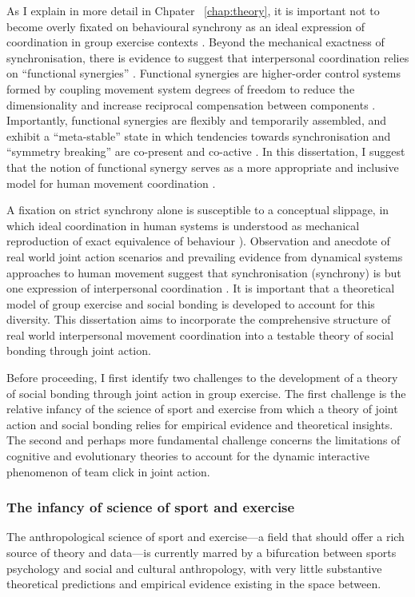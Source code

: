 \begin{CJK}{UTF8}{gbsn}
As I explain in more detail in Chpater ~\ref{chap:theory}, it is important not to become overly fixated on behavioural synchrony as an ideal expression of coordination in group exercise contexts \citep{Keller2014,Fusaroli2014}.  Beyond the mechanical exactness of synchronisation, there is evidence to suggest
that interpersonal coordination relies on ``functional synergies'' \citep{Riley2011,Turvey1990}.  Functional synergies are higher-order control systems formed by coupling movement system degrees of freedom to reduce the dimensionality and increase reciprocal compensation between components \citep{Turvey1978}. Importantly, functional synergies are flexibly and temporarily assembled, and exhibit a ``meta-stable'' state in which tendencies towards synchronisation and ``symmetry breaking'' are co-present and co-active \citep{Richardson2015}.  In this dissertation, I suggest that the notion of functional synergy serves as a more appropriate and inclusive model for human movement coordination \citep{Fusaroli2014}.

A fixation on strict synchrony alone is susceptible to a conceptual slippage, in which ideal coordination in human systems is understood as mechanical reproduction of exact equivalence of behaviour \citep[imagine an interpersonal version of the ``Dark Room Dilemma'' in neurocognition, cf.][]{Clark2013}).  Observation and anecdote of real world joint action scenarios and prevailing evidence from dynamical systems approaches to human movement suggest that synchronisation (synchrony) is but one expression of interpersonal coordination \citep{Kelso2013}.  It is important that a theoretical model of group exercise and social bonding is developed to account for this diversity.  This dissertation aims to incorporate the comprehensive structure of real world interpersonal movement coordination into a testable theory of social bonding through joint action.

Before proceeding, I first identify two challenges to the development of a theory of social bonding through joint action in group exercise.  The first challenge is the relative infancy of the science of sport and exercise from which a theory of joint action and social bonding relies for empirical evidence and theoretical insights.  The second and perhaps more fundamental challenge concerns the limitations of cognitive and evolutionary theories to account for the dynamic interactive phenomenon of team click in joint action.

\subsubsection{The infancy of science of sport and exercise}
The anthropological science of sport and exercise---a field that should offer a rich source of theory and data---is currently marred by a bifurcation between sports psychology and social and cultural anthropology, with very little substantive theoretical predictions and empirical evidence existing in the space between.


\end{CJK}
